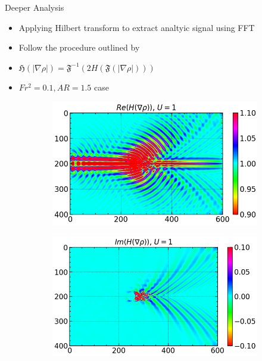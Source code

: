 \documentclass[aspectratio=169,xcolor=dvipsnames]{beamer}
\begin{document}
\begin{frame}{Deeper Analysis}
    \begin{itemize}
        \item Applying Hilbert transform to extract analtyic signal using FFT
        \item Follow the procedure outlined by \cite{mercier2008reflection}
        \item $\mathfrak{H}(|\nabla \rho|) = \mathfrak{F}^{-1}(2H(\mathfrak{F}(| \nabla \rho |)))$
        \item $Fr^2 = 0.1, AR = 1.5$ case
    \end{itemize}
    
    \begin{figure}
        \begin{subfigure}[b]{.45\textwidth}
            \includegraphics[width=\textwidth]{figures/ReH.png}
        \end{subfigure}
        \begin{subfigure}[b]{.45\textwidth}
            \includegraphics[width=\textwidth]{figures/ImH.png}
        \end{subfigure}
    \end{figure}
\end{frame}
\end{document}
